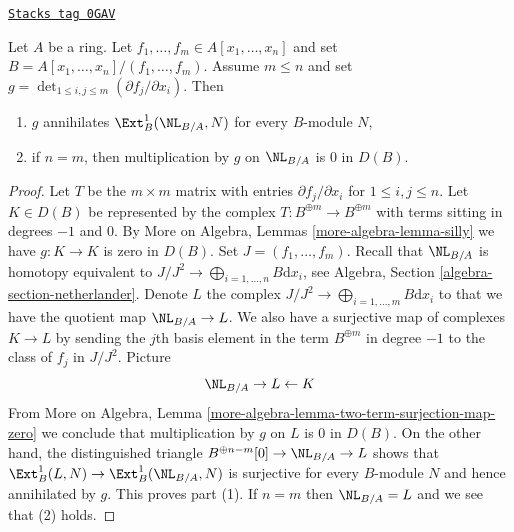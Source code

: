 \begin{lemma}
\label{restricted-lemma-presentation-rig-smooth}
\href{https://stacks.math.columbia.edu/tag/0GAV}{\texttt{Stacks tag 0GAV}}

Let $A$ be a ring. Let $f_1, \ldots, f_m \in A[x_1, \ldots, x_n]$
and set $B = A[x_1, \ldots, x_n]/(f_1, \ldots, f_m)$. Assume $m \leq n$
and set $g = \det_{1 \leq i, j \leq m}(\partial f_j/\partial x_i)$.
Then
\begin{enumerate}
\item $g$ annihilates $\Ext^1_B(\NL_{B/A}, N)$ for every $B$-module $N$,
\item if $n = m$, then multiplication by $g$ on $\NL_{B/A}$ is $0$ in $D(B)$.
\end{enumerate}
\end{lemma}

\begin{proof}
Let $T$ be the $m \times m$ matrix with entries $\partial f_j/\partial x_i$
for $1 \leq i, j \leq n$. Let $K \in D(B)$ be represented by the complex
$T : B^{\oplus m} \to B^{\oplus m}$ with terms sitting in degrees $-1$ and $0$.
By More on Algebra, Lemmas \ref{more-algebra-lemma-silly}
we have $g : K \to K$ is zero in $D(B)$. Set $J = (f_1, \ldots, f_m)$.
Recall that $\NL_{B/A}$ is homotopy equivalent to
$J/J^2 \to \bigoplus_{i = 1, \ldots, n} B\text{d}x_i$, see
Algebra, Section \ref{algebra-section-netherlander}.
Denote $L$ the complex $J/J^2 \to \bigoplus_{i = 1, \ldots, m} B\text{d}x_i$
to that we have the quotient map $\NL_{B/A} \to L$.
We also have a surjective map of complexes $K \to L$
by sending the $j$th basis element in the term $B^{\oplus m}$
in degree $-1$ to the class of $f_j$ in $J/J^2$. Picture
$$
\NL_{B/A} \to L \leftarrow K
$$
From
More on Algebra, Lemma \ref{more-algebra-lemma-two-term-surjection-map-zero}
we conclude that multiplication by $g$ on $L$ is $0$ in $D(B)$.
On the other hand, the distinguished triangle
$B^{\oplus n - m}[0] \to \NL_{B/A} \to L$
shows that $\Ext^1_B(L, N) \to \Ext^1_B(\NL_{B/A}, N)$ is surjective
for every $B$-module $N$ and hence annihilated by $g$.
This proves part (1).
If $n = m$ then $\NL_{B/A} = L$ and we see that (2) holds.
\end{proof}

